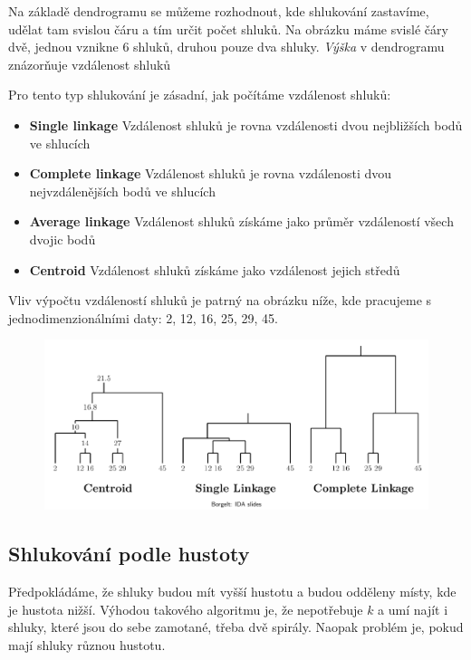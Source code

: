 \documentclass[10pt,a4paper]{article}
\begin{document}
Na základě dendrogramu se můžeme rozhodnout, kde shlukování zastavíme, udělat tam svislou čáru a tím určit počet shluků. Na obrázku máme svislé čáry dvě, jednou vznikne 6 shluků, druhou pouze dva shluky. \textit{Výška} v dendrogramu znázorňuje vzdálenost shluků

Pro tento typ shlukování je zásadní, jak počítáme vzdálenost shluků:
\begin{itemize}
\item \textbf{Single linkage} Vzdálenost shluků je rovna vzdálenosti dvou nejbližších bodů ve shlucích
\item \textbf{Complete linkage} Vzdálenost shluků je rovna vzdálenosti dvou nejvzdálenějších bodů ve shlucích
\item \textbf{Average linkage} Vzdálenost shluků získáme jako průměr vzdáleností všech dvojic bodů
\item \textbf{Centroid} Vzdálenost shluků získáme jako vzdálenost jejich středů
\end{itemize}

Vliv výpočtu vzdáleností shluků je patrný na obrázku níže, kde pracujeme s jednodimenzionálními daty: 2, 12, 16, 25, 29, 45.

\begin{figure}[ht!]
\centering
\includegraphics[width=\textwidth]{img/dendrogram-example.png}
\end{figure}

\subsection{Shlukování podle hustoty}

Předpokládáme, že shluky budou mít vyšší hustotu a budou odděleny místy, kde je hustota nižší. Výhodou takového algoritmu je, že nepotřebuje $k$ a umí najít i shluky, které jsou do sebe zamotané, třeba dvě spirály. Naopak problém je, pokud mají shluky různou hustotu.
\end{document}
